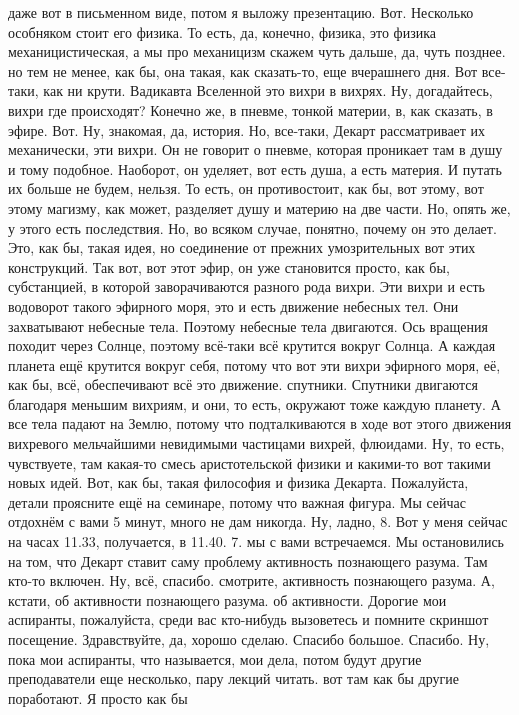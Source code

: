 даже вот в письменном виде, потом я выложу презентацию. Вот. Несколько особняком
стоит его физика. То есть, да, конечно, физика, это физика механицистическая, а
мы про механицизм скажем чуть дальше, да, чуть позднее. но тем не менее, как бы,
она такая, как сказать-то, еще вчерашнего дня. Вот все-таки, как ни крути.
Вадикавта Вселенной это вихри в вихрях. Ну, догадайтесь, вихри где происходят?
Конечно же, в пневме, тонкой материи, в, как сказать, в эфире. Вот. Ну,
знакомая, да, история. Но, все-таки, Декарт рассматривает их механически, эти
вихри. Он не говорит о пневме, которая проникает там в душу и тому подобное.
Наоборот, он уделяет, вот есть душа, а есть материя. И путать их больше не
будем, нельзя. То есть, он противостоит, как бы, вот этому, вот этому магизму,
как может, разделяет душу и материю на две части. Но, опять же, у этого есть
последствия. Но, во всяком случае, понятно, почему он это делает. Это, как бы,
такая идея, но соединение от прежних умозрительных вот этих конструкций. Так
вот, вот этот эфир, он уже становится просто, как бы, субстанцией, в которой
заворачиваются разного рода вихри. Эти вихри и есть водоворот такого эфирного
моря, это и есть движение небесных тел. Они захватывают небесные тела. Поэтому
небесные тела двигаются. Ось вращения походит через Солнце, поэтому всё-таки всё
крутится вокруг Солнца. А каждая планета ещё крутится вокруг себя, потому что
вот эти вихри эфирного моря, её, как бы, всё, обеспечивают всё это движение.
спутники. Спутники двигаются благодаря меньшим вихриям, и они, то есть, окружают
тоже каждую планету. А все тела падают на Землю, потому что подталкиваются в
ходе вот этого движения вихревого мельчайшими невидимыми частицами вихрей,
флюидами. Ну, то есть, чувствуете, там какая-то смесь аристотельской физики и
какими-то вот такими новых идей. Вот, как бы, такая философия и физика Декарта.
Пожалуйста, детали проясните ещё на семинаре, потому что важная фигура. Мы
сейчас отдохнём с вами 5 минут, много не дам никогда. Ну, ладно, 8. Вот у меня
сейчас на часах 11.33, получается, в 11.40. 7. мы с вами встречаемся. Мы
остановились на том, что Декарт ставит саму проблему активность познающего
разума. Там кто-то включен. Ну, всё, спасибо. смотрите, активность познающего
разума. А, кстати, об активности познающего разума. об активности. Дорогие мои
аспиранты, пожалуйста, среди вас кто-нибудь вызоветесь и помните скриншот
посещение. Здравствуйте, да, хорошо сделаю. Спасибо большое. Спасибо. Ну, пока
мои аспиранты, что называется, мои дела, потом будут другие преподаватели еще
несколько, пару лекций читать. вот там как бы другие поработают. Я просто как бы
